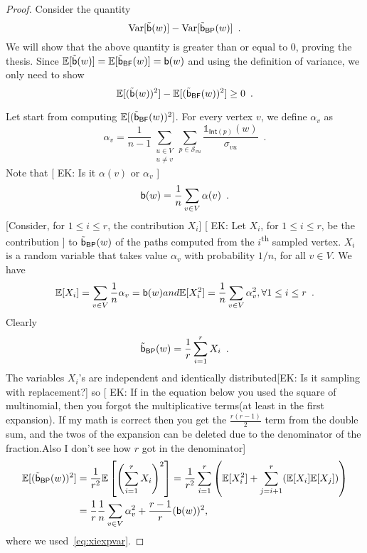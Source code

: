 \begin{proof}
  Consider the quantity
  \[
  \mathrm{Var}[\tilde{\mathsf{b}}(w)]-\mathrm{Var}[\tilde{\mathsf{b}}_\mathsf{BP}(w)]\enspace.\]
  We will show that the above quantity is greater than or equal to 0, proving
  the thesis.
  Since
  $\mathbb{E}[\tilde{\mathsf{b}}(w)]=\mathbb{E}[\tilde{\mathsf{b}}_\mathsf{BF}(w)]=\mathsf{b}(w)$
  and using the definition of variance, we only need to show 
  \begin{equation}\label{eq:inequal}
    \exp[(\tilde\betw(w))^2]-\exp[(\tilde\betw_\mathsf{BF}(w))^2]\ge
    0\enspace.
  \end{equation}

  Let start from computing $\mathbb{E}[(\tilde{\mathsf{b}}_\mathsf{BF}(w))^2]$. For every
  vertex $v$, we define $\alpha_v$ as
  \[
  \alpha_v=\frac{1}{n-1}\sum_{\substack{u\in V
  \\u\neq
  v}}\sum_{p\in\mathcal{S}_{vu}}\frac{\mathds{1}_{\mathsf{Int}(p)}(w)}{\sigma_{vu}}\enspace.
  \]
  Note that 
  [ EK: Is it $\alpha(v)$ or $\alpha_v$ ]
  \begin{equation}\label{eq:betwalpha}
    \betw(w)=\frac{1}{n}\sum_{v\in V}\alpha(v)\enspace.
  \end{equation}
  [Consider, for $1\le i \le r$, the contribution $X_i$] [ EK:
  Let $X_i$, for $1\le i \le r$, be the contribution ] to $\tilde{\mathsf{b}}_\mathsf{BP}(w)$
  of the paths computed from the $i$\textsuperscript{th} sampled vertex. $X_i$
  is a random variable that takes value $\alpha_v$ with probability $1/n$, for
  all $v\in V$. We have
  \begin{equation}\label{eq:xiexpvar}
    \exp[X_i]=\sum_{v\in V}\frac{1}{n}\alpha_v=\betw(w) \mbox{ and }
    \exp[X_i^2]=\frac{1}{n}\sum_{v\in V}\alpha_v^2, \forall 1\le i\le r\enspace.
  \end{equation}
  Clearly
  \[
  \tilde{\mathsf{b}}_\mathsf{BP}(w)=\frac{1}{r}\sum_{i=1}^r X_i\enspace.
  \]
  The variables $X_i$'s are independent and identically distributed[EK: Is it sampling with replacement?] so
  [ EK: If in the equation below you used the square of multinomial, then you forgot the multiplicative terms(at least in the 
  first expansion). If my math is correct then you get the $\frac{r(r-1)}{2}$ term from the double sum, and 
  the twos of the expansion can be deleted due to the denominator of the fraction.Also I don't see 
  how $r$ got in the denominator]
  \begin{align}\label{eq:expxisquared}
    \exp[(\tilde\betw_\mathsf{BP}(w))^2]&=\frac{1}{r^2}\exp\left[\left(\sum_{i=1}^rX_i\right)^2\right]=\frac{1}{r^2}\sum_{i=1}^r\left(\exp[X_i^2]+\sum_{j=i+1}^r(\exp[X_i]\exp[X_j])\right)\nonumber\\
	&=\frac{1}{r}\frac{1}{n}\sum_{v\in V}\alpha_v^2+\frac{r-1}{r}(\betw(w))^2,
\end{align}
where we used~\eqref{eq:xiexpvar}.


\end{proof}
